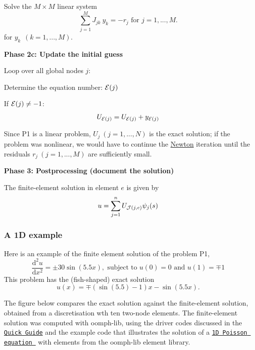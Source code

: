 \begin{DoxyItemize}
\item Solve the $ M \times M$ linear system \[ \sum_{j=1}^{M} J_{jk} \ y_k = - r_j \mbox{\ \ \ for $j=1,...,M.$} \] for $ y_k \ \ (k=1,...,M).$

{\bfseries  Phase 2c\-: Update the initial guess }
\end{DoxyItemize}


\begin{DoxyItemize}
\item Loop over all global nodes $ j$\-:
\begin{DoxyItemize}
\item Determine the equation number\-: $ {\cal E}(j) $
\item If $ {\cal E}(j) \ne -1 $\-: \[ U_{{\cal E}(j)} = U_{{\cal E}(j)} + y_{{\cal E}(j)} \]
\end{DoxyItemize}
\end{DoxyItemize}


\begin{DoxyItemize}
\item Since P1 is a linear problem, $ U_j \ (j=1,...,N) $ is the exact solution; if the problem was nonlinear, we would have to continue the \hyperlink{index_Newton}{Newton} iteration until the residuals $r_j \ (j=1,...,M) $ are sufficiently small.

{\bfseries  Phase 3\-: Postprocessing (document the solution)}
\item The finite-\/element solution in element $e$ is given by \[ u = \sum_{j=1}^{n} U_{{\cal J}(j,e)} \psi_j(s) \]




\end{DoxyItemize}\hypertarget{index_example_P1}{}\subsubsection{A 1\-D example}\label{index_example_P1}
Here is an example of the finite element solution of the problem P1, \[ \frac{\mbox{d}^2 u}{\mbox{d} x^2} = \pm 30 \sin(5.5 x), \mbox{\ \ \ subject to $u(0)=0$ and $u(1)=\mp 1$} \] This problem has the (fish-\/shaped) exact solution \[ u(x) = \mp \left(\sin(5.5)-1\right) x - \sin(5.5 x). \]

The figure below compares the exact solution against the finite-\/element solution, obtained from a discretisation wth ten two-\/node elements. The finite-\/element solution was computed with {\ttfamily oomph-\/lib}, using the driver codes discussed in the \href{../../quick_guide/html/index.html}{\tt Quick Guide} and the example code that illustrates the solution of a \href{../../poisson/one_d_poisson/html/index.html}{\tt 1\-D Poisson equation } with elements from the {\ttfamily oomph-\/lib} element library.

